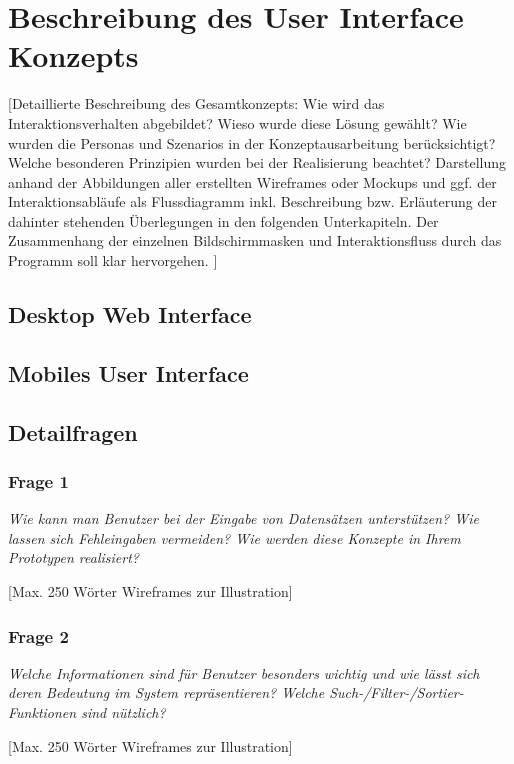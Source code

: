 \section{Beschreibung des User Interface Konzepts}

[Detaillierte Beschreibung des Gesamtkonzepts: Wie wird das Interaktionsverhalten abgebildet? Wieso wurde diese Lösung gewählt? Wie wurden die Personas und Szenarios in der Konzeptausarbeitung berücksichtigt? Welche besonderen Prinzipien wurden bei der Realisierung beachtet?
Darstellung anhand der Abbildungen aller erstellten Wireframes oder Mockups und ggf. der Interaktionsabläufe als Flussdiagramm inkl. Beschreibung bzw. Erläuterung der dahinter stehenden Überlegungen in den folgenden Unterkapiteln. Der Zusammenhang der einzelnen Bildschirmmasken und Interaktionsfluss durch das Programm soll klar hervorgehen. ]

\subsection{Desktop Web Interface}
\subsection{Mobiles User Interface}
\subsection{Detailfragen}

\subsubsection{Frage 1}

\emph{Wie kann man Benutzer bei der Eingabe von Datensätzen unterstützen? Wie lassen sich Fehleingaben vermeiden? Wie werden diese Konzepte in Ihrem Prototypen realisiert?}


[Max. 250 Wörter Wireframes zur Illustration]



\subsubsection{Frage 2}

\emph{Welche Informationen sind für Benutzer besonders wichtig und wie lässt sich deren Bedeutung im System repräsentieren? Welche Such-/Filter-/Sortier-Funktionen sind nützlich?}



[Max. 250 Wörter Wireframes zur Illustration]



